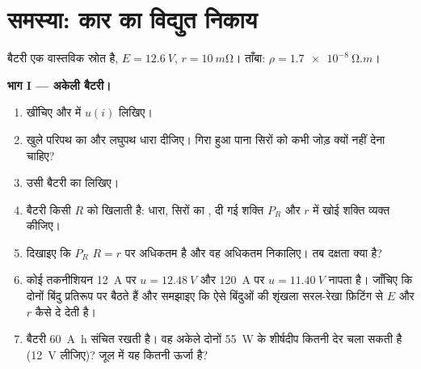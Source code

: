 \section{समस्या: कार का विद्युत निकाय}

\begin{problem}
\label{pb:b1:dc-circuits:1}
बैटरी एक वास्तविक स्रोत है,  $E = \qty{12.6}{V}$,  $r = \qty{10}{m\ohm}$। ताँबा: $\rho = \qty{1.7e-8}{\ohm.m}$।

\medskip
\noindent\textbf{भाग I --- अकेली बैटरी।}
\begin{enumerate}
  \item {} खींचिए और  में $u(i)$ लिखिए।
  \item खुले परिपथ का  और लघुपथ धारा दीजिए। गिरा हुआ पाना सिरों को
        कभी जोड़ क्यों नहीं देना चाहिए?
  \item उसी बैटरी का  लिखिए।
  \item बैटरी किसी  $R$ को खिलाती है: धारा, सिरों का , दी
        गई शक्ति $P_R$ और $r$ में खोई शक्ति व्यक्त कीजिए।
  \item दिखाइए कि $P_R$ $R = r$ पर अधिकतम है और वह अधिकतम निकालिए। तब
        दक्षता क्या है?
  \item कोई तकनीशियन \qty{12}{A} पर $u = \qty{12.48}{V}$ और \qty{120}{A}
        पर $u = \qty{11.40}{V}$ नापता है। जाँचिए कि दोनों बिंदु प्रतिरूप पर
        बैठते हैं और समझाइए कि ऐसे बिंदुओं की शृंखला सरल-रेखा फ़िटिंग से $E$
        और $r$ कैसे दे देती है।
  \item बैटरी \qty{60}{A.h} संचित रखती है। वह अकेले दोनों \qty{55}{W} के
        शीर्षदीप कितनी देर चला सकती है (\qty{12}{V} लीजिए)? जूल में यह
        कितनी ऊर्जा है?
\end{enumerate}


\end{problem}
